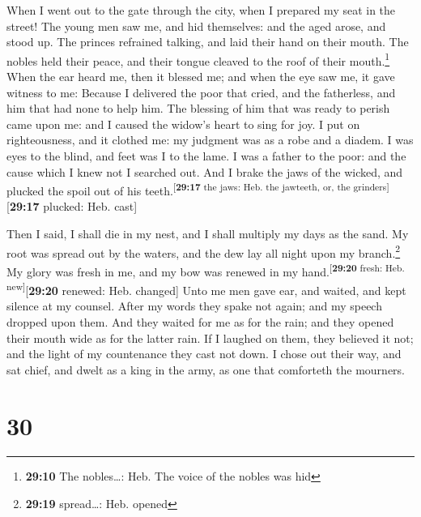  When I went out to the gate through the city, when I
prepared my seat in the street!  The young men saw me, and
hid themselves: and the aged arose, and stood up.  The
princes refrained talking, and laid their hand on their mouth.
 The nobles held their peace, and their tongue cleaved to
the roof of their mouth.\footnote{\textbf{29:10} The nobles\ldots: Heb.
  The voice of the nobles was hid}  When the ear heard
me, then it blessed me; and when the eye saw me, it gave witness to me:
 Because I delivered the poor that cried, and the
fatherless, and him that had none to help him.  The
blessing of him that was ready to perish came upon me: and I caused the
widow's heart to sing for joy.  I put on righteousness,
and it clothed me: my judgment was as a robe and a diadem.
 I was eyes to the blind, and feet was I to the lame.
 I was a father to the poor: and the cause which I knew
not I searched out.  And I brake the jaws of the wicked,
and plucked the spoil out of his
teeth.\textsuperscript{{[}\textbf{29:17} the jaws: Heb. the jawteeth,
or, the grinders{]}}{[}\textbf{29:17} plucked: Heb. cast{]}

 Then I said, I shall die in my nest, and I shall
multiply my days as the sand.  My root was spread out by
the waters, and the dew lay all night upon my branch.\footnote{\textbf{29:19}
  spread\ldots: Heb. opened}  My glory was fresh in me,
and my bow was renewed in my hand.\textsuperscript{{[}\textbf{29:20}
fresh: Heb. new{]}}{[}\textbf{29:20} renewed: Heb. changed{]}
 Unto me men gave ear, and waited, and kept silence at my
counsel.  After my words they spake not again; and my
speech dropped upon them.  And they waited for me as for
the rain; and they opened their mouth wide as for the latter rain.
 If I laughed on them, they believed it not; and the
light of my countenance they cast not down.  I chose out
their way, and sat chief, and dwelt as a king in the army, as one that
comforteth the mourners.

\hypertarget{section-29}{%
\section{30}\label{section-29}}


